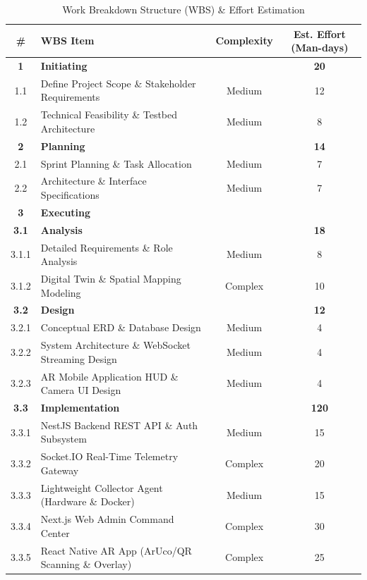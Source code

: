 \begin{table}[H]
    \centering
    \caption{Work Breakdown Structure (WBS) \& Effort Estimation}
    \begin{tabular}{|c|l|c|c|}
        \hline
        \textbf{\#} & \textbf{WBS Item} & \textbf{Complexity} & \textbf{Est. Effort (Man-days)} \\ \hline
        \textbf{1} & \textbf{Initiating} & & \textbf{20} \\ \hline
        1.1 & Define Project Scope \& Stakeholder Requirements & Medium & 12 \\ \hline
        1.2 & Technical Feasibility \& Testbed Architecture & Medium & 8 \\ \hline
        \textbf{2} & \textbf{Planning} & & \textbf{14} \\ \hline
        2.1 & Sprint Planning \& Task Allocation & Medium & 7 \\ \hline
        2.2 & Architecture \& Interface Specifications & Medium & 7 \\ \hline
        \textbf{3} & \textbf{Executing} & & \\ \hline
        \textbf{3.1} & \textbf{Analysis} & & \textbf{18} \\ \hline
        3.1.1 & Detailed Requirements \& Role Analysis & Medium & 8 \\ \hline
        3.1.2 & Digital Twin \& Spatial Mapping Modeling & Complex & 10 \\ \hline
        \textbf{3.2} & \textbf{Design} & & \textbf{12} \\ \hline
        3.2.1 & Conceptual ERD \& Database Design & Medium & 4 \\ \hline
        3.2.2 & System Architecture \& WebSocket Streaming Design & Medium & 4 \\ \hline
        3.2.3 & AR Mobile Application HUD \& Camera UI Design & Medium & 4 \\ \hline
        \textbf{3.3} & \textbf{Implementation} & & \textbf{120} \\ \hline
        3.3.1 & NestJS Backend REST API \& Auth Subsystem & Medium & 15 \\ \hline
        3.3.2 & Socket.IO Real-Time Telemetry Gateway & Complex & 20 \\ \hline
        3.3.3 & Lightweight Collector Agent (Hardware \& Docker) & Medium & 15 \\ \hline
        3.3.4 & Next.js Web Admin Command Center & Complex & 30 \\ \hline
        3.3.5 & React Native AR App (ArUco/QR Scanning \& Overlay) & Complex & 25 \\ \hline

\end{tabular}
\end{table}

